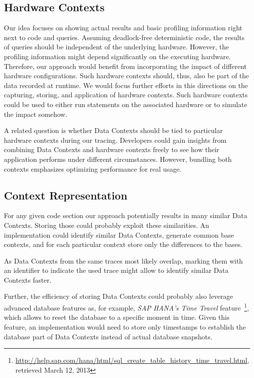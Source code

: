 \subsection{Hardware Contexts}
Our idea focuses on showing actual results and basic profiling information right next to code and queries.
Assuming deadlock-free deterministic code, the results of queries should be independent of the underlying hardware.
However, the profiling information might depend significantly on the executing hardware.
Therefore, our approach would benefit from incorporating the impact of different hardware configurations.
Such hardware contexts should, thus, also be part of the data recorded at runtime.
We would focus further efforts in this directions on the capturing, storing, and application of hardware contexts.
Such hardware contexts could be used to either run statements on the associated hardware or to simulate the impact somehow.

A related question is whether Data Contexts should be tied to particular hardware contexts during our tracing.
Developers could gain insights from combining Data Contexts and hardware contexts freely to see how their application performs under different circumstances.
However, bundling both contexts emphasizes optimizing performance for real usage.

\subsection{Context Representation}
For any given code section our approach potentially results in many similar Data Contexts. Storing those could probably exploit these similarities.
An implementation could identify similar Data Contexts, generate common base contexts, and for each particular context store only the differences to the bases.

As Data Contexts from the same traces most likely overlap, marking them with an identifier to indicate the used trace might allow to identify similar Data Contexts faster.

Further, the efficiency of storing Data Contexts could probably also leverage advanced database features as, for example, \emph{SAP HANA's Time Travel} feature~\footnote{\url{http://help.sap.com/hana/html/sql_create_table_history_time_travel.html}, retrieved March 12, 2013}, which allows to reset the database to a specific moment in time.
Given this feature, an implementation would need to store only timestamps to establish the database part of Data Contexts instead of actual database snapshots.
